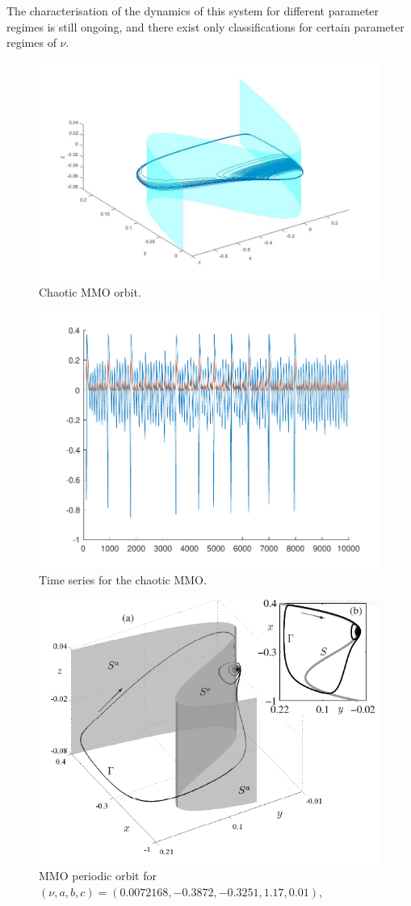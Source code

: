 The characterisation of the dynamics of this system for different parameter regimes is still ongoing, and there exist only classifications for certain parameter regimes of $\nu$.
\begin{figure}[h!]\centering
	\includegraphics[width= 0.5 \textwidth]{Images/chaoticEvdp}
	\caption{Chaotic MMO orbit.}
	\label{fig: MMo3pic}
\end{figure}
\begin{figure}[h!]\centering
	\includegraphics[width= 0.5 \textwidth]{Images/eVDPts}
	\caption{Time series for the chaotic MMO.}
	\label{fig: MMo4pic}
\end{figure}
\begin{figure}[h!]\centering
	\includegraphics[width= \textwidth]{Images/MMO3}
	\caption{MMO periodic orbit for $(\nu,a,b,c)= (0.0072168,-0.3872,-0.3251,1.17,0.01)$, \citep{MMO}}
	\label{fig: MMo5pic}
\end{figure}

